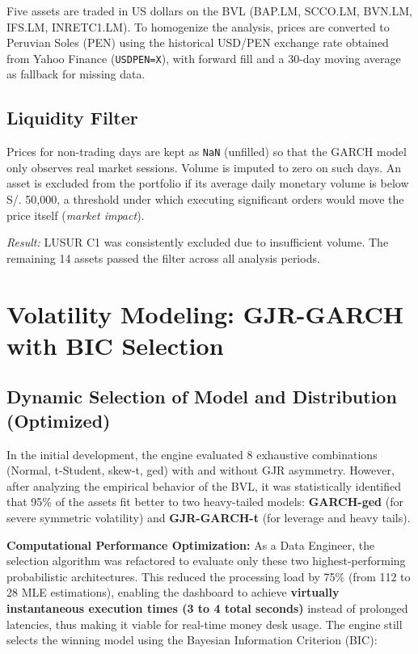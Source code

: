 \documentclass[11pt,a4paper]{article}
\begin{document}
Five assets are traded in US dollars on the BVL (BAP.LM, SCCO.LM, BVN.LM,
IFS.LM, INRETC1.LM). To homogenize the analysis, prices are converted to Peruvian Soles
(PEN) using the historical USD/PEN exchange rate obtained from Yahoo Finance
(\texttt{USDPEN=X}), with forward fill and a 30-day moving average as fallback for missing data.

\subsection{Liquidity Filter}

Prices for non-trading days are kept as \texttt{NaN} (unfilled) so that the GARCH model
only observes real market sessions. Volume is imputed to zero on such days. An asset is
excluded from the portfolio if its average daily monetary volume is below S/. 50,000,
a threshold under which executing significant orders would move the price itself (\textit{market impact}).

\textit{Result:} LUSUR C1 was consistently excluded due to insufficient volume. The
remaining 14 assets passed the filter across all analysis periods.

\section{Volatility Modeling: GJR-GARCH with BIC Selection}

\subsection{Dynamic Selection of Model and Distribution (Optimized)}

In the initial development, the engine evaluated 8 exhaustive combinations (Normal, t-Student, skew-t, ged)
with and without GJR asymmetry. However, after analyzing the empirical behavior of the BVL, it was
statistically identified that 95\% of the assets fit better to two heavy-tailed models:
\textbf{GARCH-ged} (for severe symmetric volatility) and \textbf{GJR-GARCH-t} (for leverage
and heavy tails).

\textbf{Computational Performance Optimization:} As a Data Engineer, the selection algorithm was
refactored to evaluate only these two highest-performing probabilistic architectures.
This reduced the processing load by 75\% (from 112 to 28 MLE estimations), enabling the
dashboard to achieve \textbf{virtually instantaneous execution times (3 to 4 total seconds)}
instead of prolonged latencies, thus making it viable for real-time money desk usage.
The engine still selects the winning model using the Bayesian Information Criterion (BIC):
\end{document}
